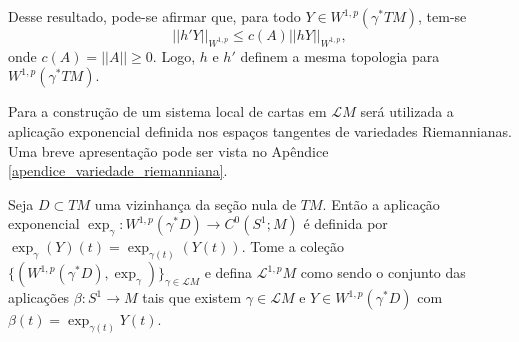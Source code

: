 \documentclass[12pt]{book}
\newcommand{\caminhosexponenciaisSobolev}{\mathcal{L}^{1,p}M}
\newcommand{\circulo}{S^{1}}
\newcommand{\espacosobolev}[1]{W^{1,p}(#1)}
\newcommand{\norma}[1]{||#1||}
\newcommand{\normaWp}[1]{||#1||_{W^{1,p}}}
\newcommand{\pullbackfibradotangente}[2]{#1^{*}T#2}
\newcommand{\pullbackfibradotangenteM}[1]{\pullbackfibradotangente{#1}{M}}
\newcommand{\lacocontrateis}{\mathcal{L}M}
\begin{document}
	Desse resultado, pode-se afirmar que, para todo $Y \in \espacosobolev{\pullbackfibradotangente{\gamma}{M}}$, tem-se
	$$
	\normaWp{h'Y} \leq c(A)\normaWp{hY},
	$$
	onde $c(A) = \norma{A}\geq 0$.
	Logo, $h$ e $h'$ definem a mesma topologia para $\espacosobolev{\pullbackfibradotangenteM{\gamma}}$.
	
	Para a construção de um sistema local de cartas em $\lacocontrateis$ será utilizada a aplicação exponencial definida nos espaços tangentes de variedades Riemannianas. Uma breve apresentação pode ser vista no Apêndice \ref{apendice_variedade_riemanniana}.
	
	Seja $D \subset TM$ uma vizinhança da seção nula de $TM$. Então a aplicação exponencial $\exp_{\gamma}: \espacosobolev{\gamma^{*}D} \to C^{0}(\circulo;M)$ é definida por $\exp_{\gamma}(Y)(t) = \exp_{\gamma(t)}(Y(t))$.
	Tome a coleção $\{ (\espacosobolev{\gamma^{*}D}, \exp_{\gamma}) \}_{\gamma \in \lacocontrateis}$ e defina $\caminhosexponenciaisSobolev$ como sendo o conjunto das aplicações $\beta:\circulo\to M$ tais que existem $\gamma\in \lacocontrateis$ e $Y \in \espacosobolev{\gamma^{*}D}$ com $\beta(t)=\exp_{\gamma(t)}Y(t)$.
	
\end{document}
